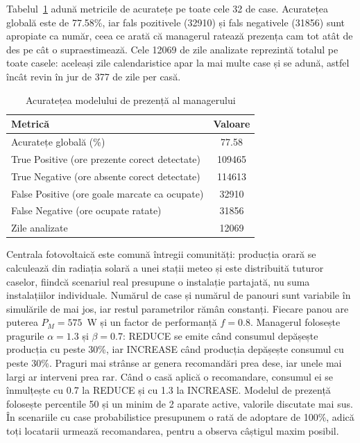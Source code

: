 \documentclass[12pt,a4paper]{report}
\begin{document}
Tabelul~\ref{tab:acuratete_prezenta} adună metricile de acuratețe pe toate cele 32 de case. Acuratețea globală este de 77.58\%, iar fals pozitivele (32910) și fals negativele (31856) sunt apropiate ca număr, ceea ce arată că managerul ratează prezența cam tot atât de des pe cât o supraestimează. Cele 12069 de zile analizate reprezintă totalul pe toate casele: aceleași zile calendaristice apar la mai multe case și se adună, astfel încât revin în jur de 377 de zile per casă.

\begin{table}[h]
  \centering
  \begin{tabular}{|l|c|}
    \hline
    \textbf{Metrică}                              & \textbf{Valoare} \\
    \hline
    Acuratețe globală (\%)                        & 77.58            \\
    \hline
    True Positive (ore prezente corect detectate) & 109465           \\
    \hline
    True Negative (ore absente corect detectate)  & 114613           \\
    \hline
    False Positive (ore goale marcate ca ocupate) & 32910            \\
    \hline
    False Negative (ore ocupate ratate)           & 31856            \\
    \hline
    Zile analizate                                & 12069            \\
    \hline
  \end{tabular}
  \caption{Acuratețea modelului de prezență al managerului}
  \label{tab:acuratete_prezenta}
\end{table}

Centrala fotovoltaică este comună întregii comunități: producția orară se calculează din radiația solară a unei stații meteo și este distribuită tuturor caselor, fiindcă scenariul real presupune o instalație partajată, nu suma instalațiilor individuale. Numărul de case și numărul de panouri sunt variabile în simulările de mai jos, iar restul parametrilor rămân constanți. Fiecare panou are puterea $P_M = 575$~W și un factor de performanță $f = 0.8$. Managerul folosește pragurile $\alpha = 1.3$ și $\beta = 0.7$: REDUCE se emite când consumul depășește producția cu peste 30\%, iar INCREASE când producția depășește consumul cu peste 30\%. Praguri mai strânse ar genera recomandări prea dese, iar unele mai largi ar interveni prea rar. Când o casă aplică o recomandare, consumul ei se înmulțește cu 0.7 la REDUCE și cu 1.3 la INCREASE. Modelul de prezență folosește percentile 50 și un minim de 2 aparate active, valorile discutate mai sus. În scenariile cu case probabilistice presupunem o rată de adoptare de 100\%, adică toți locatarii urmează recomandarea, pentru a observa câștigul maxim posibil.
\end{document}
